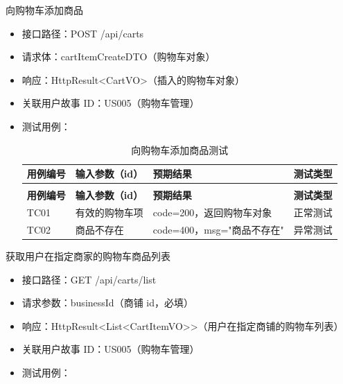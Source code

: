 \begin{levellist}
\begin{levellist}
        \item 向购物车添加商品
        \begin{itemize}
            \item 接口路径：POST /api/carts
            \item 请求体：cartItemCreateDTO（购物车对象）
            \item 响应：HttpResult<CartVO>（插入的购物车对象）
            \item 关联用户故事 ID：US005（购物车管理）
            \item 测试用例：
                  \begin{longtable}{>{\centering\arraybackslash}m{1.7cm} >{\centering\arraybackslash}m{3cm} >{\centering\arraybackslash}m{6.3cm} >{\centering\arraybackslash}m{2cm}}

                      \caption{向购物车添加商品测试} \label{tab:training}                                \\

                      \toprule
                      \textbf{用例编号} & \textbf{输入参数（id）} & \textbf{预期结果}        & \textbf{测试类型} \\
                      \midrule
                      \endfirsthead

                      \multicolumn{4}{c}{{\tablename\ \thetable{} 续表}}                         \\
                      \toprule
                      \textbf{用例编号} & \textbf{输入参数（id）} & \textbf{预期结果}        & \textbf{测试类型} \\
                      \midrule
                      \endhead

                      \bottomrule
                      \endfoot

                      TC01          & 有效的购物车项           & code=200，返回购物车对象     & 正常测试          \\
                      TC02          & 商品不存在             & code=400，msg="商品不存在" & 异常测试          \\
                  \end{longtable}
        \end{itemize}

        \item 获取用户在指定商家的购物车商品列表
        \begin{itemize}
            \item 接口路径：GET /api/carts/list
            \item 请求参数：businessId（商铺 id，必填）
            \item 响应：HttpResult<List<CartItemVO>>（用户在指定商铺的购物车列表）
            \item 关联用户故事 ID：US005（购物车管理）
            \item 测试用例：
                  \begin{longtable}{>{\centering\arraybackslash}m{1.7cm} >{\centering\arraybackslash}m{3cm} >{\centering\arraybackslash}m{6.3cm} >{\centering\arraybackslash}m{2cm}}


\end{longtable}
\end{itemize}
\end{levellist}
\end{levellist}
